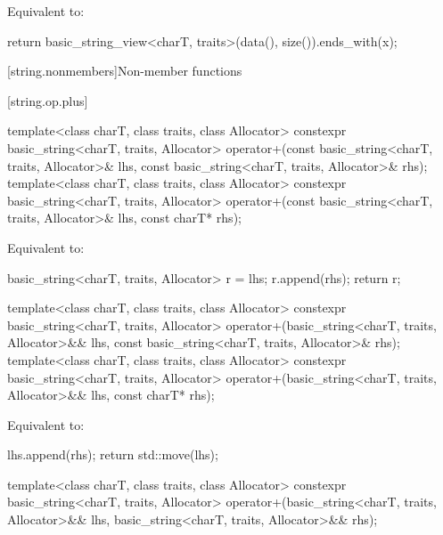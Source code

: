 \begin{itemdescr}
\pnum
\effects
Equivalent to:
\begin{codeblock}
return basic_string_view<charT, traits>(data(), size()).ends_with(x);
\end{codeblock}
\end{itemdescr}

[string.nonmembers]{Non-member functions}


[string.op.plus]{}

%
\begin{itemdecl}
template<class charT, class traits, class Allocator>
  constexpr basic_string<charT, traits, Allocator>
    operator+(const basic_string<charT, traits, Allocator>& lhs,
              const basic_string<charT, traits, Allocator>& rhs);
template<class charT, class traits, class Allocator>
  constexpr basic_string<charT, traits, Allocator>
    operator+(const basic_string<charT, traits, Allocator>& lhs, const charT* rhs);
\end{itemdecl}

\begin{itemdescr}
\pnum
\effects
Equivalent to:
\begin{codeblock}
basic_string<charT, traits, Allocator> r = lhs;
r.append(rhs);
return r;
\end{codeblock}
\end{itemdescr}

%
\begin{itemdecl}
template<class charT, class traits, class Allocator>
  constexpr basic_string<charT, traits, Allocator>
    operator+(basic_string<charT, traits, Allocator>&& lhs,
              const basic_string<charT, traits, Allocator>& rhs);
template<class charT, class traits, class Allocator>
  constexpr basic_string<charT, traits, Allocator>
    operator+(basic_string<charT, traits, Allocator>&& lhs, const charT* rhs);
\end{itemdecl}

\begin{itemdescr}
\pnum
\effects
Equivalent to:
\begin{codeblock}
lhs.append(rhs);
return std::move(lhs);
\end{codeblock}
\end{itemdescr}

%
\begin{itemdecl}
template<class charT, class traits, class Allocator>
  constexpr basic_string<charT, traits, Allocator>
    operator+(basic_string<charT, traits, Allocator>&& lhs,
              basic_string<charT, traits, Allocator>&& rhs);
\end{itemdecl}

